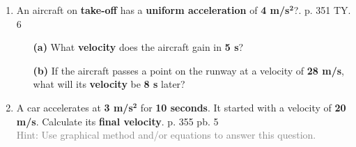 \documentclass[A4,12pt]{article}
\begin{document}
\begin{enumerate}[label=\bfseries (\arabic*)]
\item An aircraft on \textbf{take-off} has a \textbf{uniform acceleration} of \textbf{4 m/s}$\bm{^2}$?. \cite{CCEADA} p. 351 TY. 6
\begin{itemize}
    \item[\bf (a)] What \textbf{velocity} does the aircraft gain in \textbf{5 s}?
    \item[\bf (b)] If the aircraft passes a point on the runway at a velocity of \textbf{28 m/s}, what will its \textbf{velocity} be \textbf{8 s} later?
\end{itemize}
%
%
%
%
%
%
%
%
%
%
%
%
%
%
%
%
%
%
%
%
\item A car accelerates at \textbf{3 m/s}$\bm{^2}$ for \textbf{10 seconds}. It started with a velocity of \textbf{20 m/s}. Calculate its \textbf{final velocity}. \cite{CCEADA} p. 355 pb. 5\\
\textcolor{gray}{Hint: Use graphical method and/or equations to answer this question.}

\end{enumerate}
\end{document}
